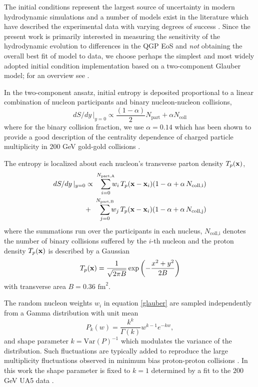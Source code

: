 \documentclass[aps,prc,reprint,amsmath,nofootinbib,superscriptaddress]{revtex4-1}
\begin{document}
The initial conditions represent the largest source of uncertainty in modern hydrodynamic simulations and a number of models exist in the literature which have described
the experimental data with varying degrees of success \cite{Schenke:2012wb, Niemi:2015qia, Chatterjee:2015aja, Moreland:2014oya, Drescher:2006pi, Adler:2013aqf}. Since the present work is primarily interested in measuring the sensitivity of the hydrodynamic evolution to differences in the QGP EoS and \emph{not} obtaining the overall best fit of model to data, we choose perhaps the simplest and most widely adopted initial condition implementation based on a two-component Glauber model; for an overview see \cite{Miller:2007ri}.

In the two-component ansatz, initial entropy is deposited proportional to a linear combination of nucleon participants and binary nucleon-nucleon collisions,
\begin{equation}
 dS/dy \,\vert_{y=0} \propto \frac{(1-\alpha)}{2}N_\text{part} + \alpha N_\text{coll}
 \label{twocomponent}
\end{equation}
where for the binary collision fraction, we use $\alpha=0.14$ which has been shown to provide a good description of the centrality dependence of charged particle 
multiplicity in $200$ GeV gold-gold collisions \cite{Shen:2014sfi}.

The entropy is localized about each nucleon's transverse parton density $T_p({\bf x})$,
\begin{eqnarray}
 dS/dy \,\vert_{y=0} &\propto& \smashoperator{\sum_{i=0}^{N_\text{part,A}}} w_i\, T_p({\bf x} - {\bf x}_i)(1-\alpha + \alpha\, N_\text{coll,i}) \nonumber \\
                     &+& \smashoperator{\sum_{j=0}^{N_\text{part,B}}} w_j\, T_p({\bf x} - {\bf x}_i)(1-\alpha + \alpha\, N_\text{coll,j})
 \label{glauber}
\end{eqnarray}
where the summations run over the participants in each nucleus, $N_\text{coll,i}$ denotes the number of binary collisions suffered by the $i$-th nucleon 
and the proton density $T_p({\bf x})$ is described by a Gaussian
\begin{equation}
 T_p({\bf x}) = \frac{1}{\sqrt{2 \pi B}} \exp \left(-\frac{x^2+y^2}{2 B} \right)
\end{equation}
with transverse area $B = 0.36$ $\text{fm}^2$.

The random nucleon weights $w_i$ in equation \eqref{glauber} are sampled independently from a Gamma distribution with unit mean
\begin{equation}
 P_k(w) = \frac{k^k}{\Gamma(k)} w^{k-1} e^{-k w},
\end{equation}
and shape parameter $k = \text{Var}(P)^{-1}$ which modulates the variance of the distribution. 
Such fluctuations are typically added to reproduce the large multiplicity fluctuations observed in minimum bias proton-proton collisions \cite{Adare:2008ns, Dumitru:2012yr, Moreland:2012qw, Bozek:2013uha, Shen:2014sfi}. 
In this work the shape parameter is fixed to $k=1$ determined by a fit to the $200$ GeV UA5 data \cite{Ansorge:1988kn}. 
\end{document}
